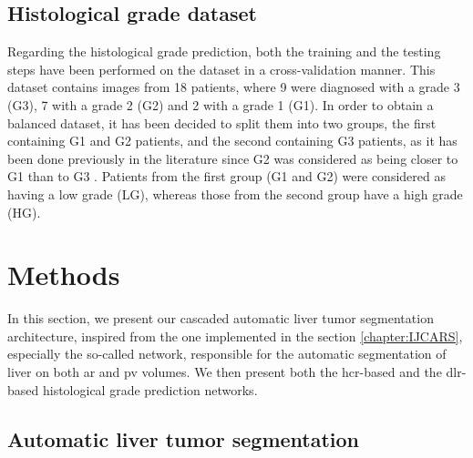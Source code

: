 \subsection{Histological grade dataset}

Regarding the histological grade prediction, both the training and the testing steps have been performed on the \textbf{} dataset in a cross-validation manner.
This dataset contains images from 18 patients, where 9 were diagnosed 
with a grade 3 (G3), 7 with a grade 2 (G2) and 2 with a grade 1 (G1). In order
to obtain a balanced dataset, it has been decided to split them
into two groups, the first containing G1 and G2 patients, and the second containing G3 patients, as it has been done previously in the literature since G2
was considered as being closer to G1 than to G3 \cite{Han2013,Zucman-Rossi2015}. Patients from the first group (G1 and G2) were considered as
having a low grade (LG), whereas those from the second group have a high
grade (HG).


\section{Methods}

In this section, we present our cascaded automatic liver tumor segmentation architecture, inspired from the one implemented in the section \ref{chapter:IJCARS}, especially the so-called  network, responsible for the automatic segmentation of liver on both \ac{ar} and \ac{pv} volumes. We then present both the \ac{hcr}-based and the \ac{dlr}-based histological grade prediction networks.


\subsection{Automatic liver tumor segmentation} \label{subsect_auto_liver_tumor_seg}

